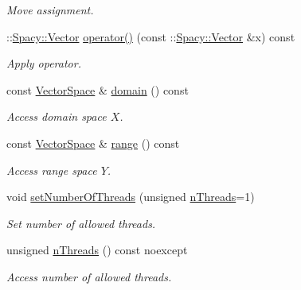 \begin{DoxyCompactItemize}
\begin{DoxyCompactList}\small\item\em Move assignment. \end{DoxyCompactList}\item 
\+::\hyperlink{classSpacy_1_1Vector}{Spacy\+::\+Vector} \hyperlink{classSpacy_1_1Kaskade_1_1Operator_a598da59e26cce77e41619ba554db5eb4_a598da59e26cce77e41619ba554db5eb4}{operator()} (const \+::\hyperlink{classSpacy_1_1Vector}{Spacy\+::\+Vector} \&x) const 
\begin{DoxyCompactList}\small\item\em Apply operator. \end{DoxyCompactList}\item 
const \hyperlink{classSpacy_1_1VectorSpace}{Vector\+Space} \& \hyperlink{classSpacy_1_1OperatorBase_a2588f9b3e0188820c4c494e63293dc6f_a2588f9b3e0188820c4c494e63293dc6f}{domain} () const 
\begin{DoxyCompactList}\small\item\em Access domain space $X$. \end{DoxyCompactList}\item 
const \hyperlink{classSpacy_1_1VectorSpace}{Vector\+Space} \& \hyperlink{classSpacy_1_1OperatorBase_ab19d3b7a6f290b1079248f1e567e53d6_ab19d3b7a6f290b1079248f1e567e53d6}{range} () const 
\begin{DoxyCompactList}\small\item\em Access range space $Y$. \end{DoxyCompactList}\item 
void \hyperlink{classSpacy_1_1Mixin_1_1NumberOfThreads_ab0c2fca77cb0d613e3bb8ce5bda11fdc_ab0c2fca77cb0d613e3bb8ce5bda11fdc}{set\+Number\+Of\+Threads} (unsigned \hyperlink{classSpacy_1_1Mixin_1_1NumberOfThreads_a385963b95b5e1ddf422393146cc71ee1_a385963b95b5e1ddf422393146cc71ee1}{n\+Threads}=1)
\begin{DoxyCompactList}\small\item\em Set number of allowed threads. \end{DoxyCompactList}\item 
unsigned \hyperlink{classSpacy_1_1Mixin_1_1NumberOfThreads_a385963b95b5e1ddf422393146cc71ee1_a385963b95b5e1ddf422393146cc71ee1}{n\+Threads} () const noexcept
\begin{DoxyCompactList}\small\item\em Access number of allowed threads. \end{DoxyCompactList}\end{DoxyCompactItemize}


